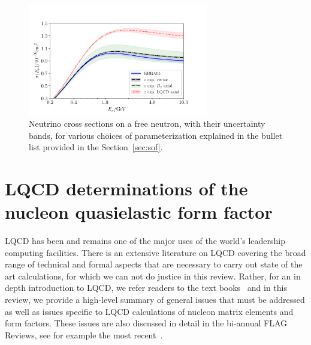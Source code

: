 \documentclass{ar-1col}
\def\done#1{{\color{brown}#1}}
\begin{document}
\begin{figure}[hbt!]
 \centering
 \includegraphics[width=0.7\textwidth]{plots/xsec_comparison-standalone.pdf}\vspace{4pt}
\caption{
 Neutrino cross sections on a free neutron, with their uncertainty bands,
 for various choices of parameterization explained in the bullet list provided in the \done{Section~\ref{sec:sof}}.
 \label{fig:nucleonxsec}
}
\end{figure}


\section{LQCD determinations of the nucleon quasielastic form factor\label{sec:lqcd}}

LQCD has been and remains one of the major uses of the world's leadership computing facilities.
There is an extensive literature on LQCD covering the broad range of technical and formal aspects that are necessary to carry out state of the art calculations, for which we can not do justice in this review.
Rather, for an in depth introduction to LQCD, we refer readers to the text books~\cite{Smit:2002ug,DeGrand:2006zz,Gattringer:2010zz} and in this review, we provide a high-level summary of general issues that must be addressed as well as issues specific to LQCD calculations of nucleon matrix elements and form factors.
These issues are also discussed in detail in the bi-annual FLAG Reviews, see for example the most recent~\cite{Aoki:2021kgd}.%
\begin{marginnote}
\end{marginnote}
\end{document}
